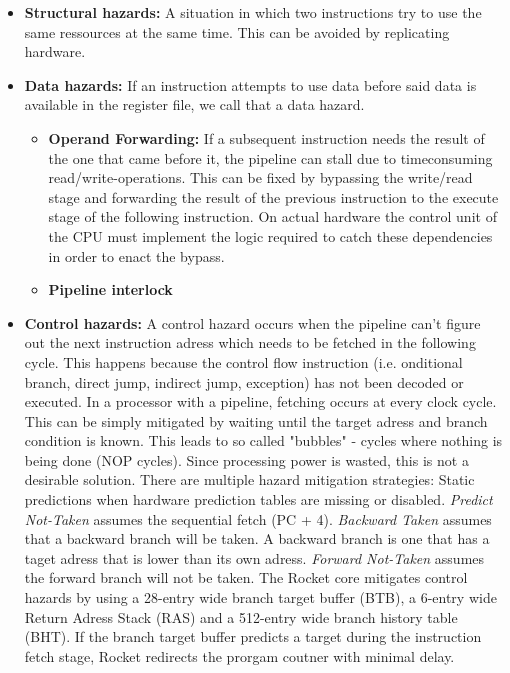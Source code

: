 \begin{itemize}
  \item \textbf{Structural hazards:} A situation in which two instructions try to use the same ressources at the same time.
    This can be avoided by replicating hardware. %
  \item \textbf{Data hazards:} If an instruction attempts to use data before said data is available in the register file, we call that a data hazard.
    \begin{itemize}
      \item \textbf{Operand Forwarding:} If a subsequent instruction needs the result of the one that came before it, the pipeline can stall due to timeconsuming read/write-operations.
        This can be fixed by bypassing the write/read stage and forwarding the result of the previous instruction to the execute stage of the following instruction. %
        On actual hardware the control unit of the CPU must implement the logic required to catch these dependencies in order to enact the bypass.
      \item \textbf{Pipeline interlock}
    \end{itemize}
  \item \textbf{Control hazards:} A control hazard occurs when the pipeline can't figure out the next instruction adress which needs to be fetched in the following cycle.
    This happens because the control flow instruction (i.e. onditional branch, direct jump, indirect jump, exception) has not been decoded or executed.
    In a processor with a pipeline, fetching occurs at every clock cycle.
    This can be simply mitigated by waiting until the target adress and branch condition is known. This leads to so called "bubbles" - cycles where nothing is being done (NOP cycles).
    Since processing power is wasted, this is not a desirable solution.
    There are multiple hazard mitigation strategies:
    Static predictions when hardware prediction tables are missing or disabled. \textit{Predict Not-Taken} assumes the sequential fetch (PC + 4).
    \textit{Backward Taken } assumes that a backward branch will be taken.
    A backward branch is one that has a taget adress that is lower than its own adress.
    \textit{Forward Not-Taken} assumes the forward branch will not be taken.
    The Rocket core mitigates control hazards by using a 28-entry wide branch target buffer (BTB),
    a 6-entry wide Return Adress Stack (RAS) and a 512-entry wide branch history table (BHT).
    If the branch target buffer predicts a target during the instruction fetch stage, Rocket redirects the prorgam coutner with minimal delay.

\end{itemize}
